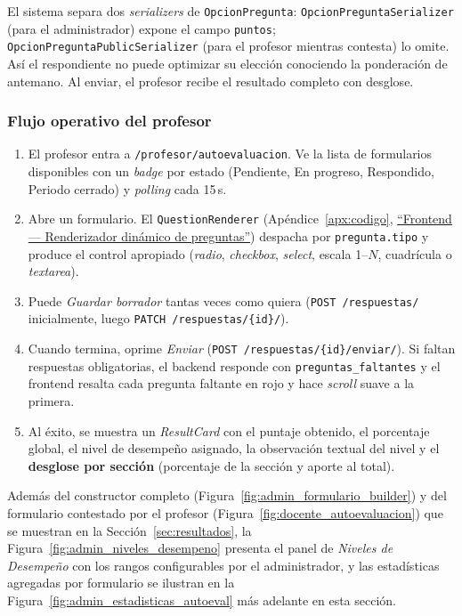 El sistema separa dos \emph{serializers} de \texttt{OpcionPregunta}: \texttt{OpcionPreguntaSerializer} (para el administrador) expone el campo \texttt{puntos}; \texttt{OpcionPreguntaPublicSerializer} (para el profesor mientras contesta) lo omite. Así el respondiente no puede optimizar su elección conociendo la ponderación de antemano. Al enviar, el profesor recibe el resultado completo con desglose.

\subsubsection{Flujo operativo del profesor}

\begin{enumerate}
    \item El profesor entra a \texttt{/profesor/autoevaluacion}. Ve la lista de formularios disponibles con un \emph{badge} por estado (Pendiente, En progreso, Respondido, Periodo cerrado) y \emph{polling} cada 15\,s.
    \item Abre un formulario. El \texttt{QuestionRenderer} (Apéndice~\ref{apx:codigo}, \hyperref[lst:renderer_preguntas]{``Frontend --- Renderizador dinámico de preguntas''}) despacha por \texttt{pregunta.tipo} y produce el control apropiado (\emph{radio}, \emph{checkbox}, \emph{select}, escala 1--$N$, cuadrícula o \emph{textarea}).
    \item Puede \emph{Guardar borrador} tantas veces como quiera (\texttt{POST /respuestas/} inicialmente, luego \texttt{PATCH /respuestas/\{id\}/}).
    \item Cuando termina, oprime \emph{Enviar} (\texttt{POST /respuestas/\{id\}/enviar/}). Si faltan respuestas obligatorias, el backend responde con \texttt{preguntas\_faltantes} y el frontend resalta cada pregunta faltante en rojo y hace \emph{scroll} suave a la primera.
    \item Al éxito, se muestra un \emph{ResultCard} con el puntaje obtenido, el porcentaje global, el nivel de desempeño asignado, la observación textual del nivel y el \textbf{desglose por sección} (porcentaje de la sección y aporte al total).
\end{enumerate}

Además del constructor completo (Figura~\ref{fig:admin_formulario_builder}) y del formulario contestado por el profesor (Figura~\ref{fig:docente_autoevaluacion}) que se muestran en la Sección~\ref{sec:resultados}, la Figura~\ref{fig:admin_niveles_desempeno} presenta el panel de \emph{Niveles de Desempeño} con los rangos configurables por el administrador, y las estadísticas agregadas por formulario se ilustran en la Figura~\ref{fig:admin_estadisticas_autoeval} más adelante en esta sección.

